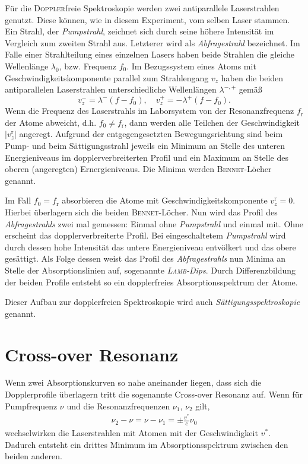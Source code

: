 \documentclass[../bericht.tex]{subfiles}
\begin{document}
      Für die \textsc{Doppler}freie Spektroskopie werden zwei antiparallele Laserstrahlen genutzt. Diese können, wie in diesem Experiment, vom selben Laser stammen. Ein Strahl, der \textit{Pumpstrahl}, zeichnet sich durch seine höhere Intensität im Vergleich zum zweiten Strahl aus. Letzterer wird als \textit{Abfragestrahl} bezeichnet.
      Im Falle einer Strahlteilung eines einzelnen Lasers haben beide Strahlen die gleiche Wellenlänge $\lambda_0$, bzw. Frequenz $f_0$. Im Bezugssystem eines Atoms mit Geschwindigkeitskomponente parallel zum Strahlengang $v_z$ haben die beiden antiparallelen Laserstrahlen unterschiedliche Wellenlängen $\lambda ^{-,+}$ gemä\ss
      \begin{equation*}
        v_z^-=\lambda^- (f-f_0),\quad v_z^+=-\lambda^+ (f-f_0).
      \end{equation*}
      \medskip
      Wenn die Frequenz des Laserstrahls im Laborsystem von der Resonanzfrequenz $f_\mathrm{r}$ der Atome abweicht, d.h. $f_0\ne f_\mathrm{r}$, dann werden alle Teilchen der Geschwindigkeit $|v_z^\mathrm{r}|$ angeregt. Aufgrund der entgegengesetzten Bewegungsrichtung sind beim Pump- und beim Sättigungsstrahl jeweils ein Minimum an Stelle des unteren Energieniveaus im dopplerverbreiterten Profil und ein Maximum an Stelle des oberen (angeregten) Ernergieniveaus. Die Minima werden \textsc{Bennet}-Löcher genannt.
      \medskip

      Im Fall $f_0 = f_\mathrm{r}$ absorbieren die Atome mit Geschwindigkeitskomponente $v_z^\mathrm{r} = 0$. Hierbei überlagern sich die beiden \textsc{Bennet}-Löcher. Nun wird das Profil des \textit{Abfragestrahls} zwei mal gemessen: Einmal ohne \textit{Pumpstrahl} und einmal mit. Ohne erscheint das dopplerverbreiterte Profil. Bei eingeschaltetem \textit{Pumpstrahl} wird durch dessen hohe Intensität das untere Energieniveau entvölkert und das obere gesättigt. Als Folge dessen weist das Profil des \textit{Abfragestrahls} nun Minima an Stelle der Absorptionslinien auf, sogenannte \textit{\textsc{Lamb}-Dips}. Durch Differenzbildung der beiden Profile entsteht so ein dopplerfreies Absorptionsspektrum der Atome.

      Dieser Aufbau zur dopplerfreien Spektroskopie wird auch \textit{Sättigungsspektroskopie} genannt.


    \section{Cross-over Resonanz}

      Wenn zwei Absorptionskurven so nahe aneinander liegen, dass sich die Dopplerprofile überlagern tritt die sogenannte Cross-over Resonanz auf. Wenn für Pumpfrequenz $\nu$ und die Resonanzfrequenzen $\nu_1$, $\nu_2$ gilt,
      \begin{align*}
        \nu_2 - \nu = \nu - \nu_1 = \pm \frac{v^*}{c} \nu_0
      \end{align*}
      wechselwirken die Laserstrahlen mit Atomen mit der Geschwindigkeit $v^*$. Dadurch entsteht ein drittes Minimum im Absorptionsspektrum zwischen den beiden anderen.
\end{document}

